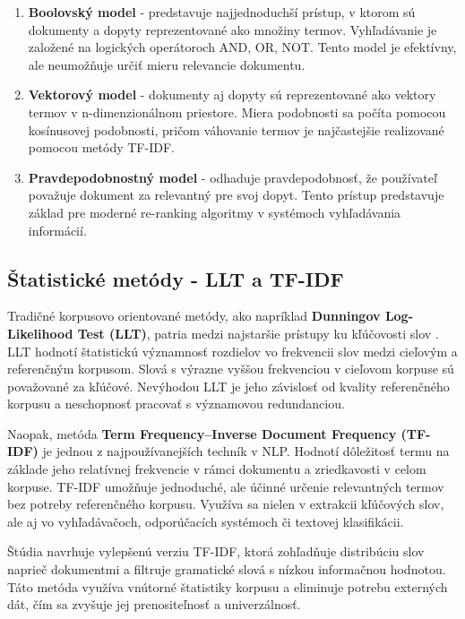 \documentclass[a4paper,12pt]{article}
\begin{document}
\begin{enumerate}
    \item \textbf{Boolovský model} - predstavuje najjednoduchší prístup, v ktorom sú dokumenty a dopyty reprezentované ako množiny termov. Vyhľadávanie je založené na logických operátoroch AND, OR, NOT. Tento model je efektívny, ale neumožňuje určiť mieru relevancie dokumentu.
    
    \item \textbf{Vektorový model} - dokumenty aj dopyty sú reprezentované ako vektory termov v n-dimenzionálnom priestore. Miera podobnosti sa počíta pomocou kosínusovej podobnosti, pričom váhovanie termov je najčastejšie realizované pomocou metódy TF-IDF.
    
    \item \textbf{Pravdepodobnostný model} - odhaduje pravdepodobnosť, že používateľ považuje dokument za relevantný pre svoj dopyt. Tento prístup predstavuje základ pre moderné re-ranking algoritmy v systémoch vyhľadávania informácií.
\end{enumerate}

\subsection{Štatistické metódy - LLT a TF-IDF}

Tradičné korpusovo orientované metódy, ako napríklad \textbf{Dunningov Log-Likelihood Test (LLT)}, patria medzi najstaršie prístupy ku kľúčovosti slov \cite{dunning1993accurate}. LLT hodnotí štatistickú významnosť rozdielov vo frekvencii slov medzi cieľovým a referenčným korpusom. Slová s výrazne vyššou frekvenciou v cieľovom korpuse sú považované za kľúčové. Nevýhodou LLT je jeho závislosť od kvality referenčného korpusu a neschopnosť pracovať s významovou redundanciou.

Naopak, metóda \textbf{Term Frequency–Inverse Document Frequency (TF-IDF)} \cite{salton1988term} je jednou z najpoužívanejších techník v NLP. Hodnotí dôležitosť termu na základe jeho relatívnej frekvencie v rámci dokumentu a zriedkavosti v celom korpuse. TF-IDF umožňuje jednoduché, ale účinné určenie relevantných termov bez potreby referenčného korpusu. Využíva sa nielen v extrakcii kľúčových slov, ale aj vo vyhľadávačoch, odporúčacích systémoch či textovej klasifikácii.

Štúdia \cite{rose2011tfidf} navrhuje vylepšenú verziu TF-IDF, ktorá zohľadňuje distribúciu slov naprieč dokumentmi a filtruje gramatické slová s nízkou informačnou hodnotou. Táto metóda využíva vnútorné štatistiky korpusu a eliminuje potrebu externých dát, čím sa zvyšuje jej prenositeľnosť a univerzálnosť.
\end{document}
